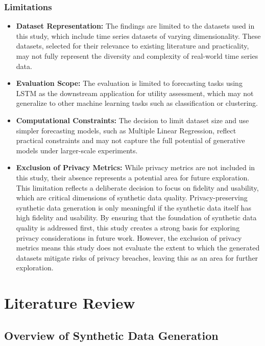 \documentclass{article}
\begin{document}
\subsubsection{Limitations}
\begin{itemize}
    \item \textbf{Dataset Representation:} The findings are limited to the datasets used in this study, which include time series datasets of varying dimensionality.  These datasets, selected for their relevance to existing literature and practicality, may not fully represent the diversity and complexity of real-world time series data.

    \item \textbf{Evaluation Scope:} The evaluation is limited to forecasting tasks using LSTM as the downstream application for utility assessment, which may not generalize to other machine learning tasks such as classification or clustering.
    
    \item \textbf{Computational Constraints:} The decision to limit dataset size and use simpler forecasting models, such as Multiple Linear Regression, reflect practical constraints and may not capture the full potential of generative models under larger-scale experiments.

    \item \textbf{Exclusion of Privacy Metrics: } While privacy metrics are not included in this study, their absence represents a potential area for future exploration. This limitation reflects a deliberate decision to focus on fidelity and usability, which are critical dimensions of synthetic data quality. Privacy-preserving synthetic data generation is only meaningful if the synthetic data itself has high fidelity and usability. By ensuring that the foundation of synthetic data quality is addressed first, this study creates a strong basis for exploring privacy considerations in future work. However, the exclusion of privacy metrics means this study does not evaluate the extent to which the generated datasets mitigate risks of privacy breaches, leaving this as an area for further exploration.

\end{itemize}

\section{Literature Review}

\subsection{Overview of Synthetic Data Generation}
\end{document}
